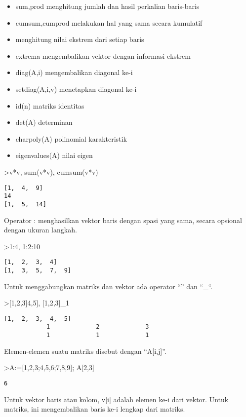 \documentclass[
]{book}
\providecommand{\tightlist}{%
  \setlength{\itemsep}{0pt}\setlength{\parskip}{0pt}}
\begin{document}
\begin{itemize}
\tightlist
\item
  sum,prod menghitung jumlah dan hasil perkalian baris-baris
\item
  cumsum,cumprod melakukan hal yang sama secara kumulatif
\item
  menghitung nilai ekstrem dari setiap baris
\item
  extrema mengembalikan vektor dengan informasi ekstrem
\item
  diag(A,i) mengembalikan diagonal ke-i
\item
  setdiag(A,i,v) menetapkan diagonal ke-i
\item
  id(n) matriks identitas
\item
  det(A) determinan
\item
  charpoly(A) polinomial karakteristik
\item
  eigenvalues(A) nilai eigen
\end{itemize}

\textgreater v*v, sum(v*v), cumsum(v*v)

\begin{verbatim}
[1,  4,  9]
14
[1,  5,  14]
\end{verbatim}

Operator : menghasilkan vektor baris dengan spasi yang sama, secara opsional dengan ukuran langkah.

\textgreater1:4, 1:2:10

\begin{verbatim}
[1,  2,  3,  4]
[1,  3,  5,  7,  9]
\end{verbatim}

Untuk menggabungkan matriks dan vektor ada operator ``\textbar{}'' dan ``\_``.

\textgreater{[}1,2,3{]}\textbar{[}4,5{]}, {[}1,2,3{]}\_1

\begin{verbatim}
[1,  2,  3,  4,  5]
            1             2             3 
            1             1             1 
\end{verbatim}

Elemen-elemen suatu matriks disebut dengan ``A{[}i,j{]}''.

\textgreater A:={[}1,2,3;4,5,6;7,8,9{]}; A{[}2,3{]}

\begin{verbatim}
6
\end{verbatim}

Untuk vektor baris atau kolom, v{[}i{]} adalah elemen ke-i dari vektor. Untuk matriks, ini mengembalikan baris ke-i lengkap dari matriks.
\end{document}
